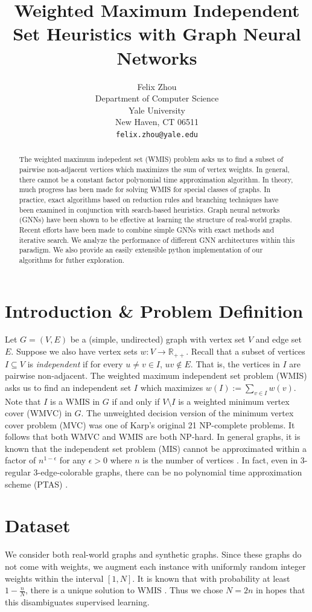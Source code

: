 \documentclass{article}
\title{Weighted Maximum Independent Set Heuristics with Graph Neural Networks}
\author{%
  Felix Zhou\\
  Department of Computer Science\\
  Yale University\\
  New Haven, CT 06511 \\
  \texttt{felix.zhou@yale.edu} \\
}
\newcommand{\R}{\mathbb{R}}
\newcommand{\sset}{\subseteq}
\begin{document}
\maketitle


\begin{abstract}
  The weighted maximum indepedent set (WMIS) problem asks us to find a subset of pairwise non-adjacent vertices
  which maximizes the sum of vertex weights.
  In general, there cannot be a constant factor polynomial time approximation algorithm.
  In theory, much progress has been made for solving WMIS for special classes of graphs.
  In practice, exact algorithms based on reduction rules and branching techniques have been examined
  in conjunction with search-based heuristics.
  Graph neural networks (GNNs) have been shown to be effective at learning the structure of real-world graphs.
  Recent efforts have been made to combine simple GNNs with exact methods and iterative search.
  We analyze the performance of different GNN architectures within this paradigm.
  We also provide an easily extensible python implementation of our algorithms for futher exploration.
\end{abstract}


\section{Introduction \& Problem Definition}
Let $G=(V, E)$ be a (simple, undirected) graph with vertex set $V$
and edge set $E$.
Suppose we also have vertex sets $w: V\to \R_{++}$.
Recall that a subset of vertices $I\sset V$ is \emph{independent}
if for every $u\neq v\in I$, $uv\notin E$.
That is, the vertices in $I$ are pairwise non-adjacent.
The weighted maximum independent set problem (WMIS)
asks us to find an independent set $I$ which maximizes $w(I) := \sum_{v\in I} w(v)$.
Note that $I$ is a WMIS in $G$
if and only if $V\setminus I$ is a weighted minimum vertex cover (WMVC) in $G$.
The unweighted decision version of the minimum vertex cover problem (MVC)
was one of Karp's original 21 NP-complete problems.
It follows that both WMVC and WMIS are both NP-hard.
In general graphs,
it is known that the independent set problem (MIS) cannot be approximated within a factor of $n^{1-\epsilon}$ for any $\epsilon > 0$ where $n$ is the number of vertices \citet{zuckerman2006linear}.
In fact, even in 3-regular 3-edge-colorable graphs,
there can be no polynomial time approximation scheme (PTAS) \citet{berman1999appr}.

\section{Dataset}
We consider both real-world graphs and synthetic graphs.
Since these graphs do not come with weights,
we augment each instance with uniformly random integer weights within the interval $[1, N]$.
It is known that with probability at least $1-\frac nN$,
there is a unique solution to WMIS \citet{isolation}.
Thus we chose $N = 2n$ in hopes that this disambiguates supervised learning.
\end{document}
